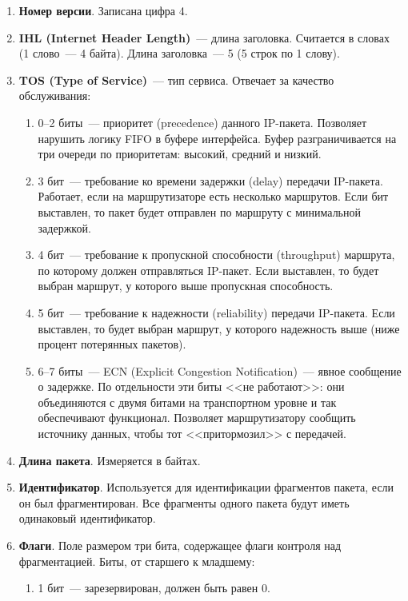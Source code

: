\begin{enumerate}
    \item \textbf{Номер версии}. Записана цифра 4.
    \item \textbf{IHL (Internet Header Length)}~--- длина заголовка. Считается в словах (1 слово~--- 4 байта). Длина заголовка~--- 5 (5 строк по 1 слову).
    \item \textbf{TOS (Type of Service)}~--- тип сервиса. Отвечает за качество обслуживания:
          \begin{enumerate}
              \item 0--2 биты~--- приоритет (precedence) данного IP-пакета. Позволяет нарушить логику FIFO в буфере интерфейса. Буфер разграничивается на три очереди по приоритетам: высокий, средний и низкий.
              \item 3 бит~--- требование ко времени задержки (delay) передачи IP-пакета. Работает, если на маршрутизаторе есть несколько маршрутов. Если бит выставлен, то пакет будет отправлен по маршруту с минимальной задержкой.
              \item 4 бит~--- требование к пропускной способности (throughput) маршрута, по которому должен отправляться IP-пакет. Если выставлен, то будет выбран маршрут, у которого выше пропускная способность.
              \item 5 бит~--- требование к надежности (reliability) передачи IP-пакета. Если выставлен, то будет выбран маршрут, у которого надежность выше (ниже процент потерянных пакетов).
              \item 6--7 биты~--- ECN (Explicit Congestion Notification)~--- явное сообщение о задержке. По отдельности эти биты <<не работают>>: они объединяются с двумя битами на транспортном уровне и так обеспечивают функционал. Позволяет маршрутизатору сообщить источнику данных, чтобы тот <<притормозил>> с передачей.
          \end{enumerate}
    \item \textbf{Длина пакета}. Измеряется в байтах.
    \item \textbf{Идентификатор}. Используется для идентификации фрагментов пакета, если он был фрагментирован. Все фрагменты одного пакета будут иметь одинаковый идентификатор.
    \item \textbf{Флаги}. Поле размером три бита, содержащее флаги контроля над фрагментацией. Биты, от старшего к младшему:
          \begin{enumerate}
              \item 1 бит~--- зарезервирован, должен быть равен 0.

\end{enumerate}
\end{enumerate}

